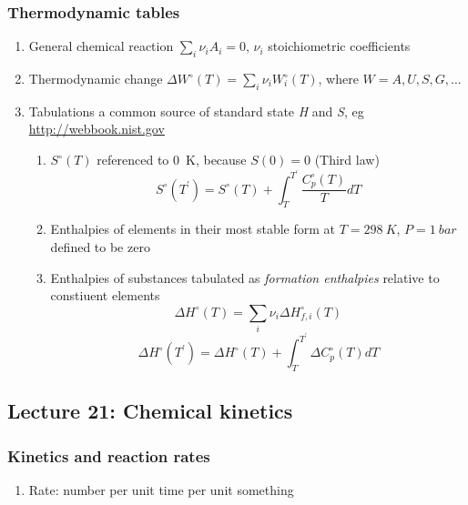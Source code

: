 \documentclass[11pt]{article}
\begin{document}
\subsubsection{Thermodynamic tables}
\label{sec:org01a4a6e}
\begin{enumerate}
\item General chemical reaction \(\sum_i \nu_i A_i = 0\), \(\nu_i\) stoichiometric coefficients
\item Thermodynamic change \(\Delta W^\circ(T) = \sum_i \nu_i W^\circ_i(T)\), where \(W = A, U, S, G, \ldots\)
\item Tabulations a common source of standard state \emph{H} and \emph{S}, eg \url{http://webbook.nist.gov}
\begin{enumerate}
\item \(S^\circ(T)\) referenced to \SI{0}{K}, because \(S(0) = 0\) (Third law)
\[ S^\circ(T^\prime) = S^\circ(T) + \int_T^{T^\prime} \frac{C^\circ_p(T)}{T} dT\]
\item Enthalpies of elements in their most stable form at \(T=\SI{298}{K}\), \(P=\SI{1}{bar}\) defined to be zero
\item Enthalpies of substances tabulated as \emph{formation enthalpies} relative to constiuent elements
\[ \Delta H^\circ(T) = \sum_i \nu_i \Delta H^\circ_{f,i}(T) \]
\[ \Delta H^\circ(T^\prime) = \Delta H^\circ(T) + \int_T^{T^\prime} \Delta C^\circ_p(T) dT\]
\end{enumerate}
\end{enumerate}
\subsection{Lecture 21: Chemical kinetics}
\label{sec:org05d4139}
\subsubsection{Kinetics and reaction rates}
\label{sec:org368a67a}
\begin{enumerate}
\item Rate: number per unit time per unit something
\end{enumerate}
\end{document}
